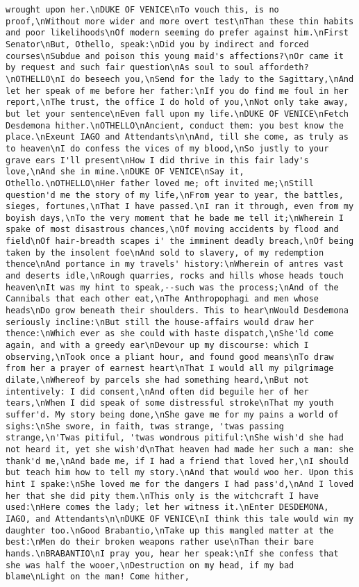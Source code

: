 \begin{verbatim}
wrought upon her.\nDUKE OF VENICE\nTo vouch this, is no proof,\nWithout more wider and more overt test\nThan these thin habits and poor likelihoods\nOf modern seeming do prefer against him.\nFirst Senator\nBut, Othello, speak:\nDid you by indirect and forced courses\nSubdue and poison this young maid's affections?\nOr came it by request and such fair question\nAs soul to soul affordeth?\nOTHELLO\nI do beseech you,\nSend for the lady to the Sagittary,\nAnd let her speak of me before her father:\nIf you do find me foul in her report,\nThe trust, the office I do hold of you,\nNot only take away, but let your sentence\nEven fall upon my life.\nDUKE OF VENICE\nFetch Desdemona hither.\nOTHELLO\nAncient, conduct them: you best know the place.\nExeunt IAGO and Attendants\n\nAnd, till she come, as truly as to heaven\nI do confess the vices of my blood,\nSo justly to your grave ears I'll present\nHow I did thrive in this fair lady's love,\nAnd she in mine.\nDUKE OF VENICE\nSay it, Othello.\nOTHELLO\nHer father loved me; oft invited me;\nStill question'd me the story of my life,\nFrom year to year, the battles, sieges, fortunes,\nThat I have passed.\nI ran it through, even from my boyish days,\nTo the very moment that he bade me tell it;\nWherein I spake of most disastrous chances,\nOf moving accidents by flood and field\nOf hair-breadth scapes i' the imminent deadly breach,\nOf being taken by the insolent foe\nAnd sold to slavery, of my redemption thence\nAnd portance in my travels' history:\nWherein of antres vast and deserts idle,\nRough quarries, rocks and hills whose heads touch heaven\nIt was my hint to speak,--such was the process;\nAnd of the Cannibals that each other eat,\nThe Anthropophagi and men whose heads\nDo grow beneath their shoulders. This to hear\nWould Desdemona seriously incline:\nBut still the house-affairs would draw her thence:\nWhich ever as she could with haste dispatch,\nShe'ld come again, and with a greedy ear\nDevour up my discourse: which I observing,\nTook once a pliant hour, and found good means\nTo draw from her a prayer of earnest heart\nThat I would all my pilgrimage dilate,\nWhereof by parcels she had something heard,\nBut not intentively: I did consent,\nAnd often did beguile her of her tears,\nWhen I did speak of some distressful stroke\nThat my youth suffer'd. My story being done,\nShe gave me for my pains a world of sighs:\nShe swore, in faith, twas strange, 'twas passing strange,\n'Twas pitiful, 'twas wondrous pitiful:\nShe wish'd she had not heard it, yet she wish'd\nThat heaven had made her such a man: she thank'd me,\nAnd bade me, if I had a friend that loved her,\nI should but teach him how to tell my story.\nAnd that would woo her. Upon this hint I spake:\nShe loved me for the dangers I had pass'd,\nAnd I loved her that she did pity them.\nThis only is the witchcraft I have used:\nHere comes the lady; let her witness it.\nEnter DESDEMONA, IAGO, and Attendants\n\nDUKE OF VENICE\nI think this tale would win my daughter too.\nGood Brabantio,\nTake up this mangled matter at the best:\nMen do their broken weapons rather use\nThan their bare hands.\nBRABANTIO\nI pray you, hear her speak:\nIf she confess that she was half the wooer,\nDestruction on my head, if my bad blame\nLight on the man! Come hither, 
\end{verbatim}

